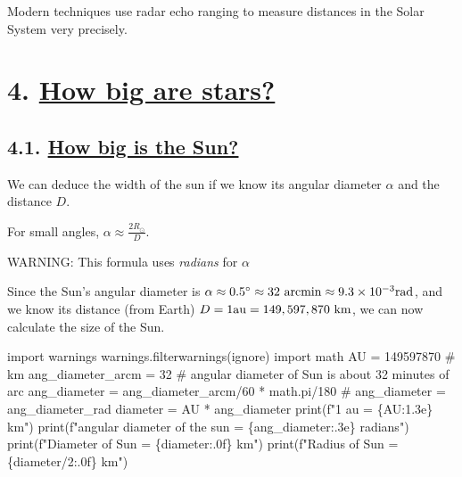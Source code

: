 \documentclass[
  letterpaper,
  DIV=11,
  numbers=noendperiod]{scrartcl}
\newenvironment{Shaded}{\begin{snugshade}}{\end{snugshade}}
\newcommand{\BuiltInTok}[1]{\textcolor[rgb]{0.00,0.23,0.31}{#1}}
\newcommand{\CommentTok}[1]{\textcolor[rgb]{0.37,0.37,0.37}{#1}}
\newcommand{\DecValTok}[1]{\textcolor[rgb]{0.68,0.00,0.00}{#1}}
\newcommand{\ImportTok}[1]{\textcolor[rgb]{0.00,0.46,0.62}{#1}}
\newcommand{\NormalTok}[1]{\textcolor[rgb]{0.00,0.23,0.31}{#1}}
\newcommand{\OperatorTok}[1]{\textcolor[rgb]{0.37,0.37,0.37}{#1}}
\newcommand{\SpecialCharTok}[1]{\textcolor[rgb]{0.37,0.37,0.37}{#1}}
\newcommand{\SpecialStringTok}[1]{\textcolor[rgb]{0.13,0.47,0.30}{#1}}
\newcommand{\StringTok}[1]{\textcolor[rgb]{0.13,0.47,0.30}{#1}}
\begin{document}
Modern techniques use radar echo ranging to measure distances in the
Solar System very precisely.

\hypertarget{how-big-are-stars}{%
\section{\texorpdfstring{4. \protect\hyperlink{toc0_}{How big are
stars?}}{4. How big are stars?}}\label{how-big-are-stars}}

\hypertarget{how-big-is-the-sun}{%
\subsection{\texorpdfstring{4.1. \protect\hyperlink{toc0_}{How big is
the Sun?}}{4.1. How big is the Sun?}}\label{how-big-is-the-sun}}

We can deduce the width of the sun if we know its angular diameter
\(\alpha\) and the distance \(D\).

For small angles, \(\alpha \approx \frac{2R_\odot}{D}\).

WARNING: This formula uses \emph{radians} for \(\alpha\)

Since the Sun's angular diameter is
\(\alpha\approx 0.5^\circ \approx 32 \ \rm{arcmin} \approx 9.3\times 10^{-3} \rm{rad}\),
and we know its distance (from Earth)
\(D = 1 \rm{au} = 149,597,870 \ \rm{km}\), we can now calculate the size
of the Sun.

\begin{Shaded}
\begin{Highlighting}[]
\ImportTok{import}\NormalTok{ warnings}
\NormalTok{warnings.filterwarnings(}\StringTok{\textquotesingle{}ignore\textquotesingle{}}\NormalTok{)}
\ImportTok{import}\NormalTok{ math}
\NormalTok{AU }\OperatorTok{=} \DecValTok{149597870} \CommentTok{\# km}
\NormalTok{ang\_diameter\_arcm }\OperatorTok{=} \DecValTok{32} \CommentTok{\# angular diameter of Sun is about 32 minutes of arc}
\NormalTok{ang\_diameter }\OperatorTok{=}\NormalTok{ ang\_diameter\_arcm}\OperatorTok{/}\DecValTok{60} \OperatorTok{*}\NormalTok{ math.pi}\OperatorTok{/}\DecValTok{180} 
\CommentTok{\# ang\_diameter = ang\_diameter\_rad}
\NormalTok{diameter }\OperatorTok{=}\NormalTok{ AU }\OperatorTok{*}\NormalTok{ ang\_diameter}
\BuiltInTok{print}\NormalTok{(}\SpecialStringTok{f"1 au = }\SpecialCharTok{\{}\NormalTok{AU}\SpecialCharTok{:1.3e\}}\SpecialStringTok{ km"}\NormalTok{)}
\BuiltInTok{print}\NormalTok{(}\SpecialStringTok{f"angular diameter of the sun =  }\SpecialCharTok{\{}\NormalTok{ang\_diameter}\SpecialCharTok{:.3e\}}\SpecialStringTok{ radians"}\NormalTok{)}
\BuiltInTok{print}\NormalTok{(}\SpecialStringTok{f"Diameter of Sun = }\SpecialCharTok{\{}\NormalTok{diameter}\SpecialCharTok{:.0f\}}\SpecialStringTok{ km"}\NormalTok{)}
\BuiltInTok{print}\NormalTok{(}\SpecialStringTok{f"Radius of Sun = }\SpecialCharTok{\{}\NormalTok{diameter}\OperatorTok{/}\DecValTok{2}\SpecialCharTok{:.0f\}}\SpecialStringTok{ km"}\NormalTok{)}
\end{Highlighting}
\end{Shaded}
\end{document}
